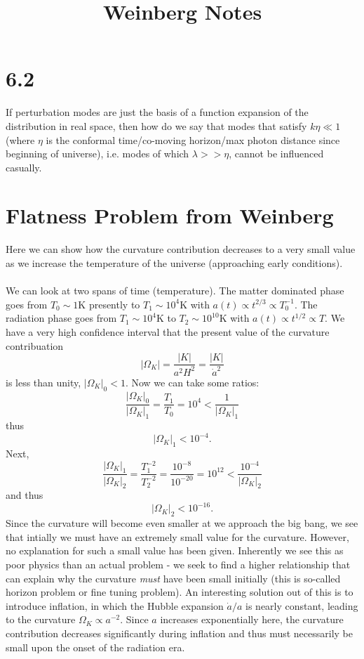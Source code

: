 \documentclass[10pt,letterpaper]{article}
\title{Weinberg Notes}
\date{}
\begin{document}
\maketitle
\section*{6.2}
If perturbation modes are just the basis of a function expansion of the distribution in real space, then how do we say that modes that satisfy $k\eta \ll 1$ (where $\eta$ is the conformal time/co-moving horizon/max photon distance since beginning of universe), i.e. modes of which $\lambda >> \eta$, cannot be influenced casually. 

\section*{Flatness Problem from Weinberg}
Here we can show how the curvature contribution decreases to a very small value as we increase the temperature of the universe (approaching early conditions).
\\ \\
We can look at two spans of time (temperature). The matter dominated phase goes from $T_0\sim 1$K presently to $T_1 \sim 10^4$K with $a(t) \propto t^{2/3} \propto T_0^{-1}$. The radiation phase goes from $T_1 \sim 10^4$K to $T _2\sim 10^{10}$K with $a(t) \propto t^{1/2} \propto T$. We have a very high confidence interval that the present value of the curvature contribuation
\[
	|\Omega_K| = \frac{|K|}{a^2 H^2} = \frac{|K|}{\dot a^2}
\]
is less than unity, $|\Omega_K|_0 < 1$. Now we can take some ratios:
\[
	\frac{|\Omega_{K}|_0}{|\Omega_K|_1} = \frac{T_1}{T_0} = 10^4 < \frac{1}{|\Omega_K|_1}
\]
thus
\[
	|\Omega_K|_1 < 10^{-4}.
\] 
Next, 
\[
	\frac{|\Omega_{K}|_1}{|\Omega_K|_2} = \frac{T_1^{-2}}{T_2^{-2}} = \frac{10^{-8}}{10^{-20}}   = 10^{12} < \frac{10^{-4}}{|\Omega_K|_2}
\]
and thus
\[
	|\Omega_K|_2 < 10^{-16}.
\]
Since the curvature will become even smaller at we approach the big bang, we see that intially we must have an extremely small value for the curvature. However, no explanation for such a small value has been given. Inherently we see this as poor physics than an actual problem - we seek to find a higher relationship that can explain why the curvature \emph{must} have been small initially (this is so-called horizon problem or fine tuning problem). An interesting solution out of this is to introduce inflation, in which the Hubble expansion $\dot a/a$ is nearly constant, leading to the curvature $\Omega_K \propto a^{-2}$. Since $a$ increases exponentially here, the curvature contribution decreases significantly during inflation and thus must necessarily be small upon the onset of the radiation era. 
\end{document}
